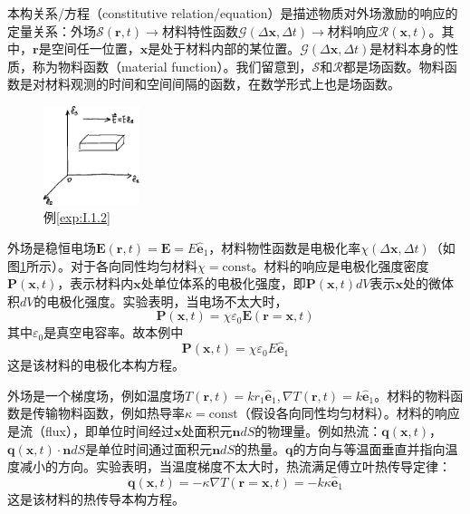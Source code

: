 \documentclass[main.tex]{subfiles}
\begin{document}
本构关系/方程（constitutive relation/equation）是描述物质对外场激励的响应的定量关系：外场$\mathcal{S}\left(\mathbf{r},t\right)\rightarrow$材料特性函数$\mathcal{G}\left(\Delta\mathbf{x},\Delta t\right)\rightarrow$材料响应$\mathcal{R}\left(\mathbf{x},t\right)$。其中，$\mathbf{r}$是空间任一位置，$\mathbf{x}$是处于材料内部的某位置。$\mathcal{G}\left(\Delta\mathbf{x},\Delta t\right)$是材料本身的性质，称为物料函数（material function）。我们留意到，$\mathcal{S}$和$\mathcal{R}$都是场函数。物料函数是对材料观测的时间和空间间隔的函数，在数学形式上也是场函数\cite[\S~9.7,p.192]{华工高数2009下}。

\begin{figure}[h]
\centering
\includegraphics[width=0.25\textwidth]{images/I.1.2.eps}
\caption{例\ref{exp:I.1.2}}
\label{fig:I.1.2}
\end{figure}

\begin{example}\label{exp:I.1.2}
外场是稳恒电场$\mathbf{E}\left(\mathbf{r},t\right)=\mathbf{E}=E\mathbf{\hat{e}}_1$，材料物性函数是电极化率$\chi\left(\Delta\mathbf{x},\Delta t\right)$（如图\ref{fig:I.1.2}所示）。对于各向同性均匀材料$\chi=\text{const}$。材料的响应是电极化强度密度$\mathbf{P}\left(\mathbf{x},t\right)$，表示材料内$\mathbf{x}$处单位体系的电极化强度，即$\mathbf{P}\left(\mathbf{x},t\right)dV$表示$\mathbf{x}$处的微体积$dV$的电极化强度。实验表明，当电场不太大时\cite[\S18.2.3,p.~57]{邓文基2009大物下}，
\[
\mathbf{P}\left(\mathbf{x},t\right)=\chi\varepsilon_0\mathbf{E}\left(\mathbf{r}=\mathbf{x},t\right)
\]
其中$\varepsilon_0$是真空电容率。故本例中
\[
\mathbf{P}\left(\mathbf{x},t\right)=\chi\varepsilon_0 E\mathbf{\hat{e}}_1
\]
这是该材料的电极化本构方程。
\end{example}

\begin{example}\label{exp:I.1.3}
外场是一个梯度场，例如温度场$T\left(\mathbf{r},t\right)=kr_1\mathbf{\hat{e}}_1,\nabla T\left(\mathbf{r},t\right)=k\mathbf{\hat{e}}_1$。材料的物料函数是传输物料函数，例如热导率$\kappa=\text{const}$（假设各向同性均匀材料）。材料的响应是流（flux），即单位时间经过$\mathbf{x}$处面积元$\mathbf{n}dS$的物理量。例如热流：$\mathbf{q}\left(\mathbf{x},t\right)$，$\mathbf{q}\left(\mathbf{x},t\right)\cdot\mathbf{n}dS$是单位时间通过面积元$\mathbf{n}dS$的热量。$\mathbf{q}$的方向与等温面垂直并指向温度减小的方向。实验表明，当温度梯度不太大时，热流满足傅立叶热传导定律\cite[\S1.1.3.1,p.~9]{钟理化工原理上册2008}：
\[
\mathbf{q}\left(\mathbf{x},t\right)=-\kappa\nabla T\left(\mathbf{r}=\mathbf{x},t\right)=-k\kappa\mathbf{\hat{e}}_1
\]
这是该材料的热传导本构方程。
\end{example}
\end{document}
